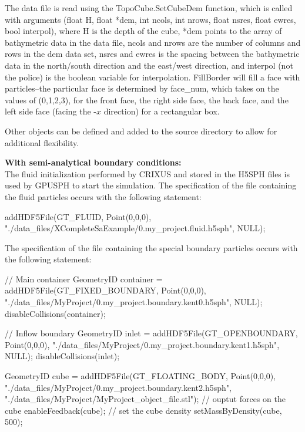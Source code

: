 \documentclass{../GPUSPHtemplate}
\begin{document}
The data file is read using the TopoCube.SetCubeDem function, which is
called with arguments (float H, float *dem, int ncols, int nrows, float
nsres, float ewres, bool interpol), where H is the depth of the cube,
*dem points to the array of bathymetric data in the data file, ncols and
nrows are the number of columns and rows in the dem data set, nsres and
ewres is the spacing between the bathymetric data in the north/south
direction and the east/west direction, and interpol (not the police) is
the boolean variable for interpolation. FillBorder will fill a face
with particles--the particular face is determined by face\_num, which
takes on the values of (0,1,2,3), for the front face, the right side
face, the back face, and the left side face (facing the -$x$ direction)
for a rectangular box.

Other objects can be defined and added to the source directory to allow
for additional flexibility.

\textbf{With semi-analytical boundary conditions:}\\

The fluid initialization performed by CRIXUS and stored in the H5SPH 
files is used by GPUSPH to start the simulation. 
The specification of the file containing the fluid particles occurs with the following statement:

\begin{ccode}
addHDF5File(GT_FLUID, Point(0,0,0), 
"./data_files/XCompleteSaExample/0.my_project.fluid.h5sph",
NULL);
\end{ccode}
The specification of the file containing the special boundary particles  occurs with the following statement:\\

\begin{ccode}
// Main container
GeometryID container =
addHDF5File(GT_FIXED_BOUNDARY, Point(0,0,0), 
  "./data_files/MyProject/0.my_project.boundary.kent0.h5sph",
  NULL);
disableCollisions(container);
  
// Inflow boundary 
GeometryID inlet =
  addHDF5File(GT_OPENBOUNDARY, Point(0,0,0), 
  "./data_files/MyProject/0.my_project.boundary.kent1.h5sph",
  NULL);
disableCollisions(inlet);

GeometryID cube =
  addHDF5File(GT_FLOATING_BODY, Point(0,0,0), 
  "./data_files/MyProject/0.my_project.boundary.kent2.h5sph",
  "./data_files/MyProject/MyProject_object_file.stl");
// ouptut forces on the cube
enableFeedback(cube);
// set the cube density
setMassByDensity(cube, 500);

\end{ccode}
\end{document}
